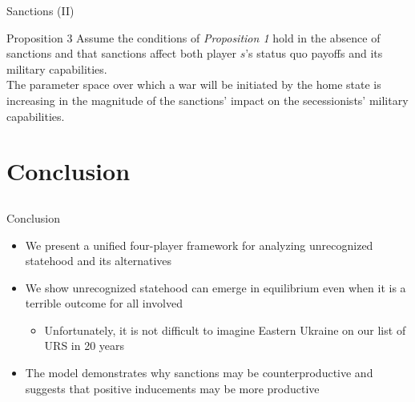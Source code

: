 \documentclass[handout]{beamer}
\begin{document}
\begin{frame}{Sanctions (II)}
\begin{beamerboxesrounded}[upper=palette tertiary, shadow=true]{Proposition 3}
  Assume the conditions of \emph{Proposition 1} hold in the absence of sanctions and that sanctions affect both player $s$'s status quo payoffs and its military capabilities. \\
	\pause
	The parameter space over which a war will be initiated by the home state is increasing in the magnitude of the sanctions' impact on the secessionists' military capabilities.
\end{beamerboxesrounded}

\end{frame}


\section{Conclusion}
\subsection{}
\begin{frame}{Conclusion}
\begin{itemize}[<+->]
	\item We present a unified four-player framework for analyzing unrecognized statehood and its alternatives
	\item We show unrecognized statehood can emerge in equilibrium even when it is a terrible outcome for all involved
		\begin{itemize}
			\item Unfortunately, it is not difficult to imagine Eastern Ukraine on our list of URS in 20 years
		\end{itemize}
	\item The model demonstrates why sanctions may be counterproductive and suggests that positive inducements may be more productive
\end{itemize}

\end{frame}
\end{document}
